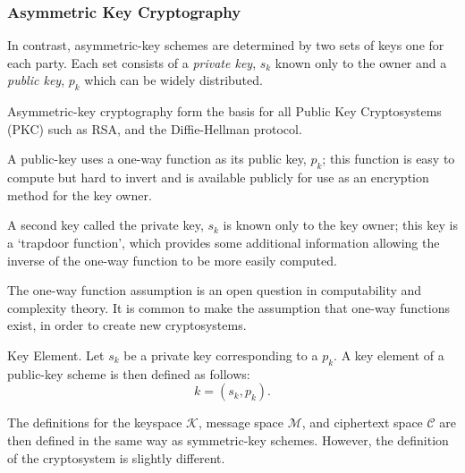 \bigskip

\subsubsection{Asymmetric Key Cryptography}


In contrast, asymmetric-key schemes are determined by two sets of keys one for each party. Each set consists of a \emph{private key}, $s_{k}$ known only to the owner and a \emph{public key}, $p_{k}$ which can be widely distributed.

Asymmetric-key cryptography form the basis for all Public Key Cryptosystems (PKC) such as RSA, and the Diffie-Hellman protocol.

A public-key uses a \gls{one-way function} as its public key, $p_{k}$; this function is easy to compute but hard to invert and is available publicly for use as an encryption method for the key owner. 

A second key called the private key,  $s_{k}$ is known only to the key owner; this key is a `\gls{trapdoor function}', which provides some additional information allowing the inverse of the one-way function to be more easily computed. 

\smallskip

\begin{nt}
The \gls{one-way function assumption} is an open question in computability and complexity theory. It is common to make the assumption that one-way functions exist, in order to create new cryptosystems. 
\end{nt}

\medskip


\begin{defn}{Key Element. } 
	Let $s_{k}$ be a private key corresponding to a $p_{k}$. 
A key element of a public-key scheme is then defined as follows:
\[k = (s_{k},p_{k}). \] 
\end{defn}

\smallskip

The definitions for the keyspace $\mathcal{K}$, message space $\mathcal{M}$, and ciphertext space $\mathcal{C}$ are then defined in the same way as symmetric-key schemes. However, the definition of the cryptosystem is slightly different.

\bigskip


